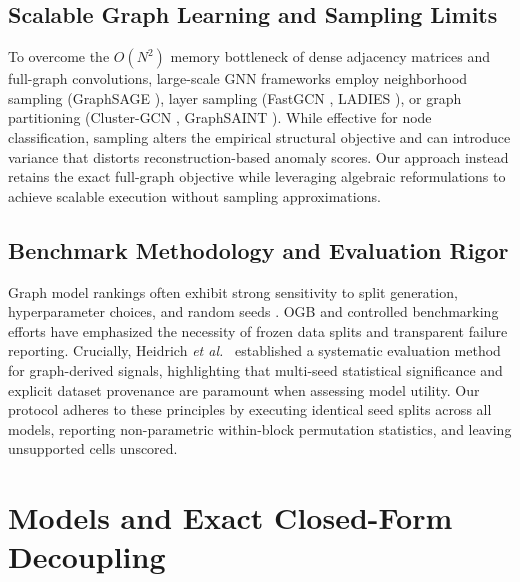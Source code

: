 \documentclass[applsci,article,submit,moreauthors,pdftex]{Definitions/mdpi}
\newcommand{\etal}{\emph{et al.}}
\begin{document}
\subsection{Scalable Graph Learning and Sampling Limits}
To overcome the $O(N^2)$ memory bottleneck of dense adjacency matrices and full-graph convolutions, large-scale GNN frameworks employ neighborhood sampling (GraphSAGE \cite{hamilton2017graphsage}), layer sampling (FastGCN \cite{chen2018fastgcn}, LADIES \cite{zou2019ladies}), or graph partitioning (Cluster-GCN \cite{chiang2019clustergcn}, GraphSAINT \cite{zeng2020graphsaint}). While effective for node classification, sampling alters the empirical structural objective and can introduce variance that distorts reconstruction-based anomaly scores. Our approach instead retains the exact full-graph objective while leveraging algebraic reformulations to achieve scalable execution without sampling approximations.

\subsection{Benchmark Methodology and Evaluation Rigor}
Graph model rankings often exhibit strong sensitivity to split generation, hyperparameter choices, and random seeds \cite{shchur2018pitfalls,errica2020fair}. OGB \cite{hu2020ogb} and controlled benchmarking efforts \cite{dwivedi2023benchmarking} have emphasized the necessity of frozen data splits and transparent failure reporting. Crucially, Heidrich \etal\ \cite{heidrich2026systematic} established a systematic evaluation method for graph-derived signals, highlighting that multi-seed statistical significance and explicit dataset provenance are paramount when assessing model utility. Our protocol adheres to these principles by executing identical seed splits across all models, reporting non-parametric within-block permutation statistics, and leaving unsupported cells unscored.

\section{Models and Exact Closed-Form Decoupling}
\label{sec:models}
\end{document}
